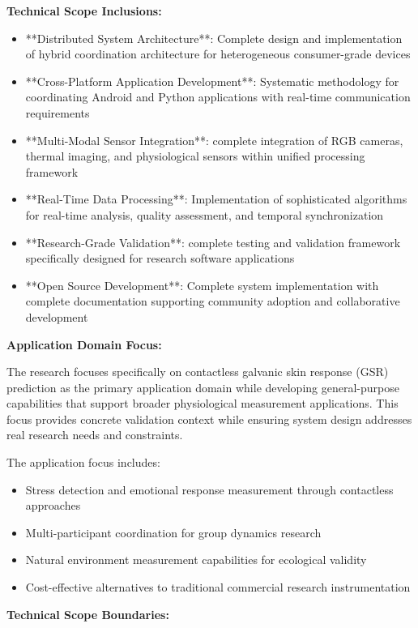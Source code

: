 \documentclass[11pt,a4paper]{article}
\begin{document}
\textbf{Technical Scope Inclusions:}

\begin{itemize}
\item **Distributed System Architecture**: Complete design and implementation of hybrid coordination architecture for
  heterogeneous consumer-grade devices
\item **Cross-Platform Application Development**: Systematic methodology for coordinating Android and Python applications
  with real-time communication requirements
\item **Multi-Modal Sensor Integration**: complete integration of RGB cameras, thermal imaging, and physiological
  sensors within unified processing framework
\item **Real-Time Data Processing**: Implementation of sophisticated algorithms for real-time analysis, quality assessment,
  and temporal synchronization
\item **Research-Grade Validation**: complete testing and validation framework specifically designed for research
  software applications
\item **Open Source Development**: Complete system implementation with complete documentation supporting community
  adoption and collaborative development

\end{itemize}
\textbf{Application Domain Focus:}

The research focuses specifically on contactless galvanic skin response (GSR)
prediction as the primary application
domain while developing general-purpose capabilities that support broader
physiological measurement applications.  This
focus provides concrete validation context while ensuring system design addresses
real research needs and constraints.

The application focus includes:

\begin{itemize}
\item Stress detection and emotional response measurement through contactless approaches
\item Multi-participant coordination for group dynamics research
\item Natural environment measurement capabilities for ecological validity
\item Cost-effective alternatives to traditional commercial research instrumentation

\end{itemize}
\textbf{Technical Scope Boundaries:}
\end{document}

